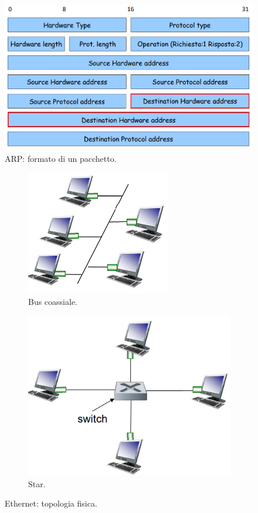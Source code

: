 \documentclass[11pt, italian, openany]{book}
\begin{document}
\begin{sloppypar}
\begin{figure}[!h]
	\centering
	\includegraphics[scale=0.25]{images/arp-pacchetto.png}
	\caption{ARP: formato di un pacchetto.}
	\label{fig:arp-pacchetto}
\end{figure}

\begin{figure}[!h]
	\begin{subfigure}[t]{0.49 \linewidth} \centering
		\includegraphics[scale=0.5]{images/ethernet-bus-coassiale.png}
		\caption{Bus coassiale.}
	\end{subfigure}
	\begin{subfigure}[t]{0.49 \linewidth} \centering
		\includegraphics[scale=0.4]{images/ethernet-star.png}
		\caption{Star.}
	\end{subfigure}
	\caption{Ethernet: topologia fisica.}
	\label{fig:ethernet-topologia}
\end{figure}


\end{sloppypar}
\end{document}
